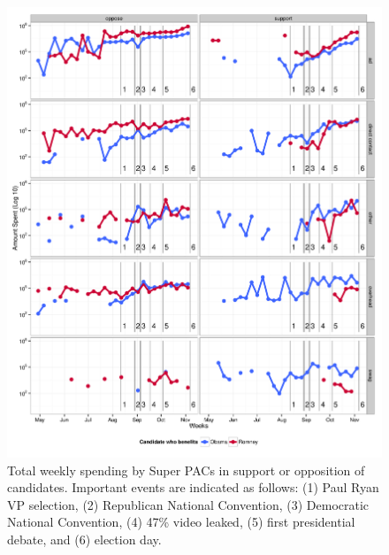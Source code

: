 \documentclass[11pt]{article}\usepackage{graphicx, color}
\newenvironment{knitrout}{}{} %
\begin{document}
\begin{knitrout}
\color{fgcolor}\begin{figure}[H]


{\centering \includegraphics[width=\textwidth]{figure/temporal_plot} 

}

\caption[Total weekly spending by Super PACs in support or opposition of candidates]{Total weekly spending by Super PACs in support or opposition of candidates. Important events are indicated as follows: (1) Paul Ryan VP selection, (2) Republican National Convention, (3) Democratic National Convention, (4) 47\% video leaked, (5) first presidential debate, and (6) election day.\label{fig:temporal_plot}}
\end{figure}


\end{knitrout}



\end{document}

